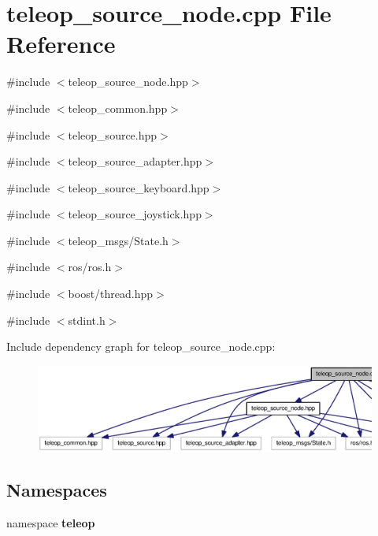 \section{teleop\_\-source\_\-node.cpp File Reference}
\label{teleop__source__node_8cpp}
{\ttfamily \#include $<$teleop\_\-source\_\-node.hpp$>$}\par
{\ttfamily \#include $<$teleop\_\-common.hpp$>$}\par
{\ttfamily \#include $<$teleop\_\-source.hpp$>$}\par
{\ttfamily \#include $<$teleop\_\-source\_\-adapter.hpp$>$}\par
{\ttfamily \#include $<$teleop\_\-source\_\-keyboard.hpp$>$}\par
{\ttfamily \#include $<$teleop\_\-source\_\-joystick.hpp$>$}\par
{\ttfamily \#include $<$teleop\_\-msgs/State.h$>$}\par
{\ttfamily \#include $<$ros/ros.h$>$}\par
{\ttfamily \#include $<$boost/thread.hpp$>$}\par
{\ttfamily \#include $<$stdint.h$>$}\par
Include dependency graph for teleop\_\-source\_\-node.cpp:
\nopagebreak
\begin{figure}[H]
\begin{center}
\leavevmode
\includegraphics[width=400pt]{teleop__source__node_8cpp__incl}
\end{center}
\end{figure}
\subsection*{Namespaces}
\begin{DoxyCompactItemize}
\item 
namespace {\bf teleop}
\end{DoxyCompactItemize}

